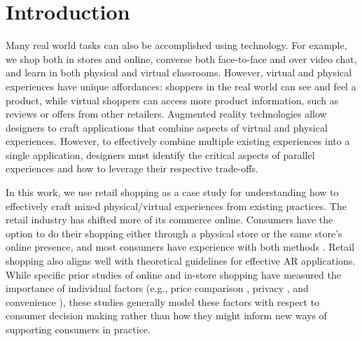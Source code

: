 \section{Introduction}

Many real world tasks can also be accomplished using technology.  For example, we shop both in stores and online, converse both face-to-face and over video chat, and learn in both physical and virtual classrooms.  However, virtual and physical experiences have unique affordances: shoppers in the real world can see and feel a product, while virtual shoppers can access more product information, such as reviews or offers from other retailers. Augmented reality technologies allow designers to craft applications that combine aspects of virtual and physical experiences. However, to effectively combine multiple existing experiences into a single application, designers must identify the critical aspects of parallel experiences and how to leverage their respective trade-offs. 

In this work, we use retail shopping as a case study for understanding how to effectively craft mixed physical/virtual experiences from existing practices. The retail industry has shifted more of its commerce online.  Consumers have the option to do their shopping either through a physical store or the same store's online presence, and most consumers have experience with both methods \cite{}.  Retail shopping also aligns well with theoretical guidelines for effective AR applications.   While specific prior studies of online and in-store shopping have measured the importance of individual factors (e.g., price comparison \cite{karlsson2005price}, privacy \cite{miyazaki2001consumer}, and convenience \cite{bednarz2010perceptions}), these studies generally model these factors with respect to consumer decision making rather than how they might inform new ways of supporting consumers in practice. 

